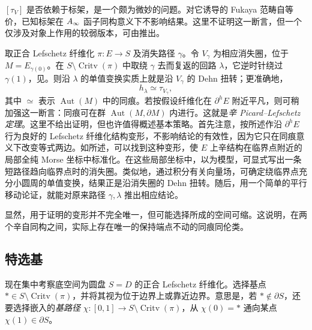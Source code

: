 \begin{note}\label{st:16.6}
$[\tau_V]$ 是否依赖于标架，是一个颇为微妙的问题。对它诱导的 Fukaya 范畴自等价，已知标架在 $A_\infty$ 函子同构意义下不影响结果。这里不证明这一断言，但一个仅涉及对象上作用的较弱版本，可由推出。
\end{note}

取正合 Lefschetz 纤维化 $\pi:E\to S$ 及消失路径 $\gamma$。令 $V_\gamma$ 为相应消失圈，位于 $M=E_{\gamma(0)}$。在 $S\setminus\operatorname{Critv}(\pi)$ 中取绕 $\gamma$ 去而复返的回路 $\lambda$，它逆时针绕过 $\gamma(1)$，见。则沿 $\lambda$ 的单值变换实质上就是沿 $V_\gamma$ 的 Dehn 扭转；更准确地，
\begin{equation}\label{eq:16.6}
h_\lambda\simeq\tau_{V_\gamma},
\end{equation}
其中 $\simeq$ 表示 $\operatorname{Aut}(M)$ 中的同痕。若按假设纤维化在 $\partial^hE$ 附近平凡，则可稍加强这一断言：同痕可在群 $\operatorname{Aut}(M,\partial M)$ 内进行。这就是\emph{辛 Picard–Lefschetz 定理}。这里不给出证明，但也许值得概述基本策略。首先注意，按所述作沿 $\partial^hE$ 行为良好的 Lefschetz 纤维化结构变形，不影响结论的有效性，因为它只在同痕意义下改变等式两边。如所述，可以找到这种变形，使
$E$ 上辛结构在临界点附近的局部全纯 Morse 坐标中标准化。在这些局部坐标中，以为模型，可显式写出一条短路径趋向临界点时的消失圈。类似地，通过积分有关向量场，可确定绕临界点充分小圆周的单值变换，结果正是沿消失圈的 Dehn 扭转。随后，用一个简单的平行移动论证，就能对原来路径 $\gamma,\lambda$ 推出相应结论。

\begin{note}\label{st:16.7}
显然，用于证明的变形并不完全唯一，但可能选择所成的空间可缩。这说明，在两个辛自同构之间，实际上存在唯一的保持端点不动的同痕同伦类。
\end{note}

\clearpage
\subsection{特选基}\label{sec:16d}
现在集中考察底空间为圆盘 $S=D$ 的正合 Lefschetz 纤维化。选择基点 $*\in S\setminus\operatorname{Critv}(\pi)$，并将其视为位于边界上或靠近边界。意思是，若 $*\notin\partial S$，还要选择嵌入的\emph{基路径} $\chi:[0,1]\to S\setminus\operatorname{Critv}(\pi)$，从 $\chi(0)=*$ 通向某点 $\chi(1)\in\partial S$。

